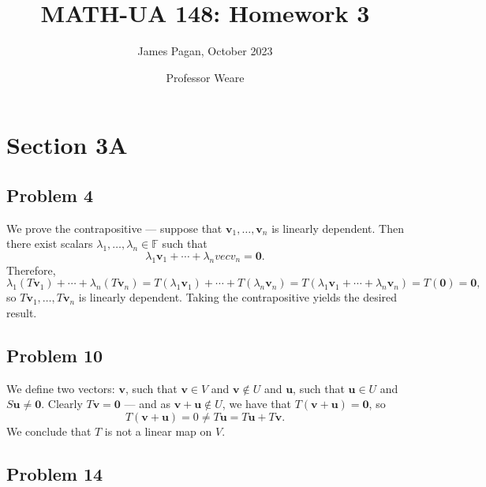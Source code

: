 \documentclass[11pt]{article}
\title{MATH-UA 148: Homework 3}
\author{James Pagan, October 2023}
\date{Professor Weare}
\renewcommand{\vec}[1]{\mathbf{#1}}
\begin{document}
\maketitle
\tableofcontents
\newpage


\section{Section 3A}


\subsection{Problem 4}

We prove the contrapositive --- suppose that $\vec{v}_{1}, \ldots, \vec{v}_{n}$ is linearly dependent. Then there exist scalars $\lambda_{1}, \ldots, \lambda_{n} \in \mathbb{F}$ such that 
\[
	\lambda_{1} \vec{v}_{1} + \cdots + \lambda_{n} vec{v}_{n} = \vec{0}.
\]
Therefore,
\[
	\lambda_{1} (T \vec{v}_{1})	+ \cdots + \lambda_{n} (T \vec{v}_{n}) = T (\lambda_{1} \vec{v}_{1}) + \cdots + T (\lambda_{n} \vec{v}_{n}) = T (\lambda_{1} \vec{v}_{1} + \cdots + \lambda_{n} \vec{v}_{n}) = T (\vec{0}) = \vec{0},
\]
so $T \vec{v}_{1}, \ldots, T \vec{v}_{n}$ is linearly dependent. Taking the contrapositive yields the desired result.


\subsection{Problem 10}

We define two vectors: $\vec{v}$, such that $\vec{v} \in V$ and $\vec{v} \notin U$ and $\vec{u}$, such that $\vec{u} \in U$ and $S \vec{u} \ne \vec{0}$. Clearly $T \vec{v} = \vec{0}$ --- and as $\vec{v} + \vec{u} \notin U$, we have that $T(\vec{v} + \vec{u}) = \vec{0}$, so
\[
	T(\vec{v} + \vec{u}) = 0 \ne T \vec{u} = T \vec{u} + T \vec{v}.
\]
We conclude that $T$ is not a linear map on $V$.


\subsection{Problem 14}
\end{document}
